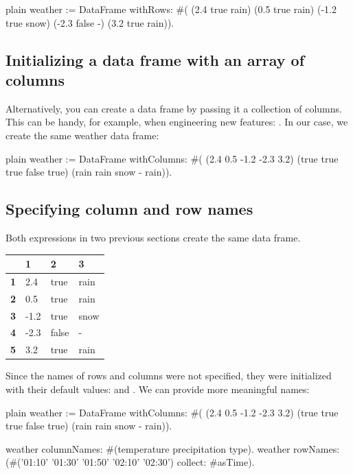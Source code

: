 \documentclass[10pt,twoside,english]{_support/latex/sbabook/sbabook}
\begin{document}
\begin{displaycode}{plain}
weather := DataFrame withRows: #(
	(2.4 true rain)
	(0.5 true rain)
	(-1.2 true snow)
	(-2.3 false -)
	(3.2 true rain)).
\end{displaycode}
\subsection{Initializing a data frame with an array of columns}
Alternatively, you can create a data frame by passing it a collection of columns. This can be handy, for example, when engineering new features: . In our case, we create the same weather data frame:

\begin{displaycode}{plain}
weather := DataFrame withColumns: #(
  (2.4 0.5 -1.2 -2.3 3.2)
  (true true true false true)
  (rain rain snow - rain)).
\end{displaycode}
\subsection{Specifying column and row names}
Both expressions in two previous sections create the same data frame.

\begin{tabular}{llll}
\toprule
 & \textbf{1} & \textbf{2} & \textbf{3} \\
\midrule
\textbf{1} & 2.4 & true & rain \\
\textbf{2} & 0.5 & true & rain \\
\textbf{3} & -1.2 & true & snow \\
\textbf{4} & -2.3 & false & - \\
\textbf{5} & 3.2 & true & rain \\
\bottomrule
\end{tabular}

Since the names of rows and columns were not specified, they were initialized with their default values:  and . We can provide more meaningful names:

\begin{displaycode}{plain}
weather := DataFrame withColumns: #(
  (2.4 0.5 -1.2 -2.3 3.2)
  (true true true false true)
  (rain rain snow - rain)).

weather columnNames: #(temperature precipitation type).
weather rowNames: (#('01:10' '01:30' '01:50' '02:10' '02:30')
		collect: #asTime).
\end{displaycode}
\end{document}
